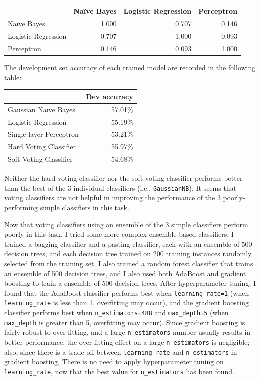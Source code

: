 \documentclass[12pt,twoside,a4paper]{article}
\begin{document}
\begin{center}
\begin{tabular}{lrrr}
\toprule
{} & Naïve Bayes & Logistic Regression & Perceptron \\ 
\midrule
Naïve Bayes & 1.000 & 0.707 & 0.146 \\ 
Logistic Regression & 0.707 & 1.000 & 0.093 \\ 
Perceptron & 0.146 & 0.093 & 1.000 \\ 
\bottomrule
\end{tabular} 
\end{center}

The development set accuracy of each trained model are recorded in the following table:

\begin{center}
\begin{tabular}{lr}
\toprule
{} & Dev accuracy \\ 
\midrule
Gaussian Naïve Bayes & 57.01\% \\ 
Logistic Regression & 55.19\% \\ 
Single-layer Perceptron & 53.21\% \\ 
\midrule
Hard Voting Classifier & 55.97\% \\
Soft Voting Classifier & 54.68\% \\
\bottomrule
\end{tabular} 
\end{center}

Neither the hard voting classifier nor the soft voting classifier performs better than the best of the 3 individual classifiers (i.e., \texttt{GaussianNB}). It seems that voting classifiers are not helpful in improving the performance of the 3 poorly-performing simple classifiers in this task.

Now that voting classifiers using an ensemble of the 3 simple classifiers perform poorly in this task, I tried some more complex ensemble-based classifiers. I trained a bagging classifier and a pasting classifier, each with an ensemble of 500 decision trees, and each decision tree trained on 200 training instances randomly selected from the training set. I also trained a random forest classifier that trains an ensemble of 500 decision trees, and I also used both AdaBoost and gradient boosting to train a ensemble of 500 decision trees. After hyperparameter tuning, I found that the AdaBoost classifier performs best when \texttt{learning\_rate=1} (when \texttt{learning\_rate} is less than 1, overfitting may occur), and the gradient boosting classifier performs best when \texttt{n\_estimators=488} and \texttt{max\_depth=5} (when \texttt{max\_depth} is greater than 5, overfitting may occur). Since gradient boosting is fairly robust to over-fitting, and a large \texttt{n\_estimators} number usually results in better performance, the over-fitting effect on a large \texttt{n\_estimators} is negligible; also, since there is a trade-off between \texttt{learning\_rate} and \texttt{n\_estimators} in gradient boosting, There is no need to apply hyperparameter tuning on \texttt{learning\_rate}, now that the best value for \texttt{n\_estimators} has been found. 
\end{document}
